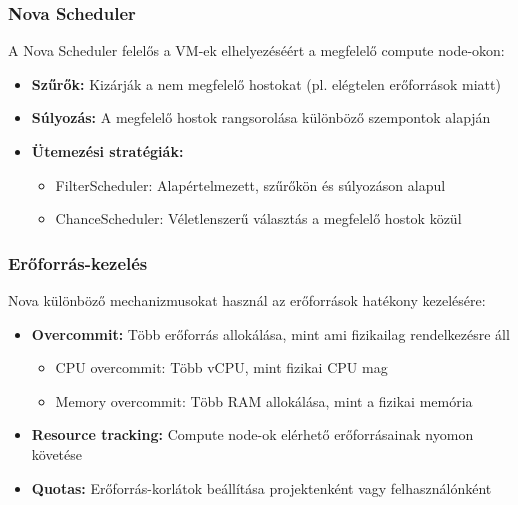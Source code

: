 \documentclass[a4paper,12pt]{article}
\begin{document}
    \subsubsection{Nova Scheduler}

    A Nova Scheduler felelős a VM-ek elhelyezéséért a megfelelő compute node-okon:

    \begin{itemize}
        \item \textbf{Szűrők:} Kizárják a nem megfelelő hostokat (pl. elégtelen erőforrások miatt)
        \item \textbf{Súlyozás:} A megfelelő hostok rangsorolása különböző szempontok alapján
        \item \textbf{Ütemezési stratégiák:}
        \begin{itemize}
            \item FilterScheduler: Alapértelmezett, szűrőkön és súlyozáson alapul
            \item ChanceScheduler: Véletlenszerű választás a megfelelő hostok közül
        \end{itemize}
    \end{itemize}

    \subsubsection{Erőforrás-kezelés}

    Nova különböző mechanizmusokat használ az erőforrások hatékony kezelésére:

    \begin{itemize}
        \item \textbf{Overcommit:} Több erőforrás allokálása, mint ami fizikailag rendelkezésre áll
        \begin{itemize}
            \item CPU overcommit: Több vCPU, mint fizikai CPU mag
            \item Memory overcommit: Több RAM allokálása, mint a fizikai memória
        \end{itemize}

        \item \textbf{Resource tracking:} Compute node-ok elérhető erőforrásainak nyomon követése

        \item \textbf{Quotas:} Erőforrás-korlátok beállítása projektenként vagy felhasználónként
    \end{itemize}
\end{document}
